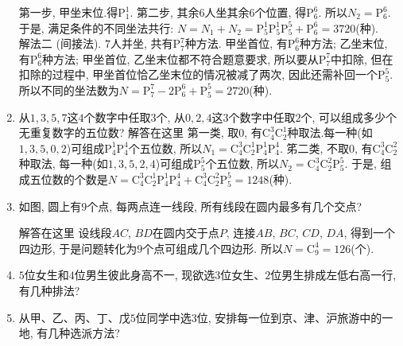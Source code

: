 \documentclass[10pt,a4paper]{article}
\begin{document}
\begin{enumerate}[1.]
第一步, 甲坐末位.得$\mathrm{P}_1^1$.
第二步, 其余$6$人坐其余$6$个位置, 得$\mathrm{P}_6^6$.
所以$N_2=\mathrm{P}_6^6$.
于是, 满足条件的不同坐法共行: $N=N_1+N_2=\mathrm{P}_5^1\mathrm{P}_5^1\mathrm{P}_5^5+\mathrm{P}_6^6=3720$(种).\\
解法二  (间接法).
$7$人并坐, 共有$\mathrm{P}_7^7$种方法.
甲坐首位, 有$\mathrm{P}_6^6$种方法; 乙坐末位, 有$\mathrm{P}_6^6$种方法; 甲坐首位, 乙坐末位都不符合题意要求, 所以要从$\mathrm{P}_7^7$中扣除, 但在扣除的过程中, 甲坐首位恰乙坐末位的情况被减了两次, 因此还需补回一个$\mathrm{P}_5^5$.
所以不同的坐法数为$N=\mathrm{P}_7^7-2\mathrm{P}_6^6+\mathrm{P}_5^5=2720$(种).
\item 从$1, 3, 5, 7$这$4$个数字中任取$3$个, 从$0, 2, 4$这$3$个数字中任取$2$个, 可以组成多少个无重复数字的五位数?
解答在这里  第一类, 取$0$, 有$\mathrm{C}_4^3\mathrm{C}_2^1$种取法.每一种(如$1, 3, 5, 0, 2$)可组成$\mathrm{P}_4^1\mathrm{P}_4^4$个五位数,
所以$N_1=\mathrm{C}_4^3\mathrm{C}_2^1\mathrm{P}_4^1\mathrm{P}_4^4$.
笫二类, 不取0, 有$\mathrm{C}_4^3\mathrm{C}_2^2$种取法, 每一种(如$1, 3, 5, 2, 4$)可组成$\mathrm{P}_5^5$个五位数,
所以$N_2=\mathrm{C}_4^3\mathrm{C}_2^2\mathrm{P}_5^5$.
于是, 组成五位数的个数是$N=\mathrm{C}_4^3\mathrm{C}_2^1\mathrm{P}_4^1\mathrm{P}_4^4+\mathrm{C}_4^3\mathrm{C}_2^2\mathrm{P}_5^5=1248$(种).
\item 如图, 圆上有$9$个点, 每两点连一线段, 所有线段在圆内最多有几个交点?
\begin{center}
\end{center}
解答在这里 设线段$AC$, $BD$在圆内交于点$P$, 连接$AB$, $BC$, $CD$, $DA$, 得到一个四边形, 于是问题转化为$9$个点可组成几个四边形.
所以$N=\mathrm{C}_9^4=126$(个).
\item $5$位女生和$4$位男生彼此身高不一, 现欲选$3$位女生、$2$位男生排成左低右高一行, 有几种排法?
\item 从甲、乙、丙、丁、戊$5$位同学中选$3$位, 安排每一位到京、津、沪旅游中的一地, 有几种选派方法?\\

\end{enumerate}
\end{document}
